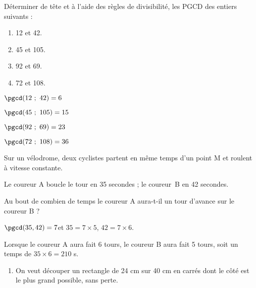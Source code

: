 \begin{colonne*exercice}


\begin{exercice*}
Déterminer de tête et à l’aide des règles de divisibilité,
les PGCD des entiers suivants :

\vspace{-2mm}
\begin{multicols}{2}
\begin{enumerate}
\item 12 et 42.
\item 45 et 105.
\item 92 et 69.
\item 72 et 108.
\end{enumerate}
\end{multicols}
\end{exercice*}
\begin{corrige}
\begin{colenumerate}{2}
\item $\pgcd(12\ ;\ 42)=6$
\item $\pgcd(45\ ;\ 105)=15$
\item $\pgcd(92\ ;\ 69)=23$
\item $\pgcd(72\ ;\ 108)=36$
\end{colenumerate}
\end{corrige}

\begin{exercice*}
Sur un vélodrome, deux cyclistes partent en même temps d’un point M et roulent à vitesse
constante.

Le coureur A boucle le tour en 35 secondes ; le coureur~B en 42
secondes.

Au bout de combien de temps le coureur A aura-t-il un tour d’avance sur le coureur B ?
\end{exercice*}
\begin{corrige}
  $\pgcd(35,42)=7$\enskip et \enskip $35=7\times5$,\enskip
  $42=7\times6$.

  Lorsque le coureur A aura fait 6 tours, le coureur B aura fait 5
  tours, soit un temps de \enskip $35\times 6=210$ s.
\end{corrige}

\begin{exercice*}
\begin{enumerate}
\item On veut découper un rectangle de 24 cm sur 40 cm en carrés dont le côté est le plus grand possible, sans perte.


\end{enumerate}
\end{exercice*}
\end{colonne*exercice}
